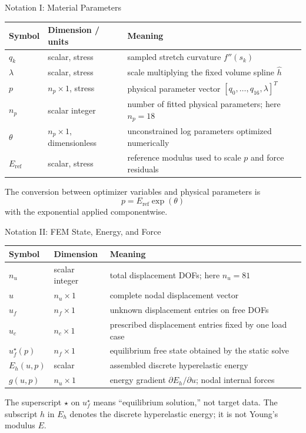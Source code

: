 \documentclass[aspectratio=169,10pt]{beamer}
\newcommand{\eref}{E_{\mathrm{ref}}}
\begin{document}
\begin{frame}{Notation I: Material Parameters}
  \small
  \begin{table}
    \centering
    \begin{tabular}{lll}
      \toprule
      Symbol & Dimension / units & Meaning \\
      \midrule
      $q_k$ & scalar, stress &
      sampled stretch curvature $f''(s_k)$ \\
      $\lambda$ & scalar, stress &
      scale multiplying the fixed volume spline $\widehat h$ \\
      $p$ & $n_p\times1$, stress &
      physical parameter vector $[q_0,\ldots,q_{16},\lambda]^T$ \\
      $n_p$ & scalar integer &
      number of fitted physical parameters; here $n_p=18$ \\
      $\theta$ & $n_p\times1$, dimensionless &
      unconstrained log parameters optimized numerically \\
      $\eref$ & scalar, stress &
      reference modulus used to scale $p$ and force residuals \\
      \bottomrule
    \end{tabular}
  \end{table}

  The conversion between optimizer variables and physical parameters is
  \[
    \boxed{p=\eref\exp(\theta)}
  \]
  with the exponential applied componentwise.
\end{frame}

\begin{frame}{Notation II: FEM State, Energy, and Force}
  \small
  \begin{table}
    \centering
    \begin{tabular}{lll}
      \toprule
      Symbol & Dimension & Meaning \\
      \midrule
      $n_u$ & scalar integer &
      total displacement DOFs; here $n_u=81$ \\
      $u$ & $n_u\times1$ &
      complete nodal displacement vector \\
      $u_f$ & $n_f\times1$ &
      unknown displacement entries on free DOFs \\
      $u_c$ & $n_c\times1$ &
      prescribed displacement entries fixed by one load case \\
      $u_f^\star(p)$ & $n_f\times1$ &
      equilibrium free state obtained by the static solve \\
      $E_h(u,p)$ & scalar &
      assembled discrete hyperelastic energy \\
      $g(u,p)$ & $n_u\times1$ &
      energy gradient $\partial E_h/\partial u$; nodal internal forces \\
      \bottomrule
    \end{tabular}
  \end{table}

  The superscript $\star$ on $u_f^\star$ means ``equilibrium solution,'' not
  target data. The subscript $h$ in $E_h$ denotes the discrete hyperelastic
  energy; it is not Young's modulus $E$.
\end{frame}
\end{document}
